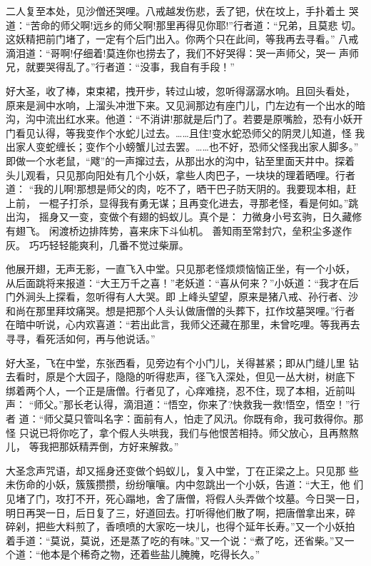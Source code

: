 二人复至本处，见沙僧还哭哩。八戒越发伤悲，丢了钯，伏在坟上，手扑着土
哭道：“苦命的师父啊!远乡的师父啊!那里再得见你耶!”行者道：“兄弟，且莫悲
切。这妖精把前门堵了，一定有个后门出入。你两个只在此间，等我再去寻看。”
八戒滴泪道：“哥啊!仔细着!莫连你也捞去了，我们不好哭得：哭一声师父，哭一
声师兄，就要哭得乱了。”行者道：“没事，我自有手段！”

好大圣，收了棒，束束裙，拽开步，转过山坡，忽听得潺潺水响。且回头看处，
原来是涧中水响，上溜头冲泄下来。又见涧那边有座门儿，门左边有一个出水的暗
沟，沟中流出红水来。他道：“不消讲!那就是后门了。若要是原嘴脸，恐有小妖开
门看见认得，等我变作个水蛇儿过去。……且住!变水蛇恐师父的阴灵儿知道，怪
我出家人变蛇缠长；变作个小螃蟹儿过去罢。……也不好，恐师父怪我出家人脚多。”
即做一个水老鼠，“飕”的一声撺过去，从那出水的沟中，钻至里面天井中。探着
头儿观看，只见那向阳处有几个小妖，拿些人肉巴子，一块块的理着晒哩。行者道：
“我的儿啊!那想是师父的肉，吃不了，晒干巴子防天阴的。我要现本相，赶上前，
一棍子打杀，显得我有勇无谋；且再变化进去，寻那老怪，看是何如。”跳出沟，
摇身又一变，变做个有翅的蚂蚁儿。真个是：
力微身小号玄驹，日久藏修有翅飞。
闲渡桥边排阵势，喜来床下斗仙机。
善知雨至常封穴，垒积尘多遂作灰。
巧巧轻轻能爽利，几番不觉过柴扉。

他展开翅，无声无影，一直飞入中堂。只见那老怪烦烦恼恼正坐，有一个小妖，
从后面跳将来报道：“大王万千之喜！”老妖道：“喜从何来？”小妖道：“我才在后
门外涧头上探看，忽听得有人大哭。即上峰头望望，原来是猪八戒、孙行者、沙
和尚在那里拜坟痛哭。想是把那个人头认做唐僧的头葬下，扛作坟墓哭哩。”行者
在暗中听说，心内欢喜道：“若出此言，我师父还藏在那里，未曾吃哩。等我再去
寻寻，看死活如何，再与他说话。”

好大圣，飞在中堂，东张西看，见旁边有个小门儿，关得甚紧；即从门缝儿里
钻去看时，原是个大园子，隐隐的听得悲声，径飞入深处，但见一丛大树，树底下
绑着两个人，一个正是唐僧。行者见了，心痒难挠，忍不住，现了本相，近前叫声：
“师父。”那长老认得，滴泪道：“悟空，你来了?快救我一救!悟空，悟空！”行者
道：“师父莫只管叫名字：面前有人，怕走了风汛。你既有命，我可救得你。那怪
只说已将你吃了，拿个假人头哄我，我们与他恨苦相持。师父放心，且再熬熬儿，
等我把那妖精弄倒，方好来解救。”

大圣念声咒语，却又摇身还变做个蚂蚁儿，复入中堂，丁在正梁之上。只见那
些未伤命的小妖，簇簇攒攒，纷纷嚷嚷。内中忽跳出一个小妖，告道：“大王，他
们见堵了门，攻打不开，死心蹋地，舍了唐僧，将假人头弄做个坟墓。今日哭一日，
明日再哭一日，后日复了三，好道回去。打听得他们散了啊，把唐僧拿出来，碎
碎剁，把些大料煎了，香喷喷的大家吃一块儿，也得个延年长寿。”又一个小妖拍
着手道：“莫说，莫说，还是蒸了吃的有味。”又一个说：“煮了吃，还省柴。”又一
个道：“他本是个稀奇之物，还着些盐儿腌腌，吃得长久。”

